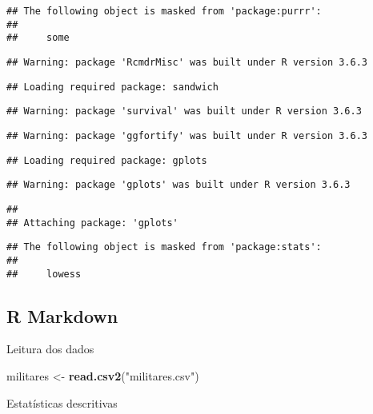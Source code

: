 \documentclass[
]{article}
\newenvironment{Shaded}{\begin{snugshade}}{\end{snugshade}}
\newcommand{\KeywordTok}[1]{\textcolor[rgb]{0.13,0.29,0.53}{\textbf{#1}}}
\newcommand{\NormalTok}[1]{#1}
\newcommand{\StringTok}[1]{\textcolor[rgb]{0.31,0.60,0.02}{#1}}
\begin{document}
\begin{verbatim}
## The following object is masked from 'package:purrr':
## 
##     some
\end{verbatim}

\begin{verbatim}
## Warning: package 'RcmdrMisc' was built under R version 3.6.3
\end{verbatim}

\begin{verbatim}
## Loading required package: sandwich
\end{verbatim}

\begin{verbatim}
## Warning: package 'survival' was built under R version 3.6.3
\end{verbatim}

\begin{verbatim}
## Warning: package 'ggfortify' was built under R version 3.6.3
\end{verbatim}

\begin{verbatim}
## Loading required package: gplots
\end{verbatim}

\begin{verbatim}
## Warning: package 'gplots' was built under R version 3.6.3
\end{verbatim}

\begin{verbatim}
## 
## Attaching package: 'gplots'
\end{verbatim}

\begin{verbatim}
## The following object is masked from 'package:stats':
## 
##     lowess
\end{verbatim}

\hypertarget{r-markdown}{%
\subsection{R Markdown}\label{r-markdown}}

Leitura dos dados

\begin{Shaded}
\begin{Highlighting}[]
\NormalTok{militares <-}\StringTok{ }\KeywordTok{read.csv2}\NormalTok{(}\StringTok{"militares.csv"}\NormalTok{)}
\end{Highlighting}
\end{Shaded}

Estatísticas descritivas
\end{document}
